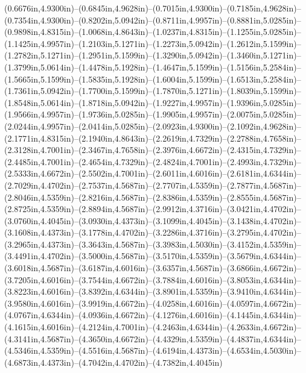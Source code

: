 (0.6676in,4.9300in)--(0.6845in,4.9628in)--(0.7015in,4.9300in)--(0.7185in,4.9628in)--(0.7354in,4.9300in)--(0.8202in,5.0942in)--(0.8711in,4.9957in)--(0.8881in,5.0285in)--(0.9898in,4.8315in)--(1.0068in,4.8643in)--(1.0237in,4.8315in)--(1.1255in,5.0285in)--(1.1425in,4.9957in)--(1.2103in,5.1271in)--(1.2273in,5.0942in)--(1.2612in,5.1599in)--(1.2782in,5.1271in)--(1.2951in,5.1599in)--(1.3290in,5.0942in)--(1.3460in,5.1271in)--(1.3799in,5.0614in)--(1.4478in,5.1928in)--(1.4647in,5.1599in)--(1.5156in,5.2584in)--(1.5665in,5.1599in)--(1.5835in,5.1928in)--(1.6004in,5.1599in)--(1.6513in,5.2584in)--(1.7361in,5.0942in)--(1.7700in,5.1599in)--(1.7870in,5.1271in)--(1.8039in,5.1599in)--(1.8548in,5.0614in)--(1.8718in,5.0942in)--(1.9227in,4.9957in)--(1.9396in,5.0285in)--(1.9566in,4.9957in)--(1.9736in,5.0285in)--(1.9905in,4.9957in)--(2.0075in,5.0285in)--(2.0244in,4.9957in)--(2.0414in,5.0285in)--(2.0923in,4.9300in)--(2.1092in,4.9628in)--(2.1771in,4.8315in)--(2.1940in,4.8643in)--(2.2619in,4.7329in)--(2.2788in,4.7658in)--(2.3128in,4.7001in)--(2.3467in,4.7658in)--(2.3976in,4.6672in)--(2.4315in,4.7329in)--(2.4485in,4.7001in)--(2.4654in,4.7329in)--(2.4824in,4.7001in)--(2.4993in,4.7329in)--(2.5333in,4.6672in)--(2.5502in,4.7001in)--(2.6011in,4.6016in)--(2.6181in,4.6344in)--(2.7029in,4.4702in)--(2.7537in,4.5687in)--(2.7707in,4.5359in)--(2.7877in,4.5687in)--(2.8046in,4.5359in)--(2.8216in,4.5687in)--(2.8386in,4.5359in)--(2.8555in,4.5687in)--(2.8725in,4.5359in)--(2.8894in,4.5687in)--(2.9912in,4.3716in)--(3.0421in,4.4702in)--(3.0760in,4.4045in)--(3.0930in,4.4373in)--(3.1099in,4.4045in)--(3.1438in,4.4702in)--(3.1608in,4.4373in)--(3.1778in,4.4702in)--(3.2286in,4.3716in)--(3.2795in,4.4702in)--(3.2965in,4.4373in)--(3.3643in,4.5687in)--(3.3983in,4.5030in)--(3.4152in,4.5359in)--(3.4491in,4.4702in)--(3.5000in,4.5687in)--(3.5170in,4.5359in)--(3.5679in,4.6344in)--(3.6018in,4.5687in)--(3.6187in,4.6016in)--(3.6357in,4.5687in)--(3.6866in,4.6672in)--(3.7205in,4.6016in)--(3.7544in,4.6672in)--(3.7884in,4.6016in)--(3.8053in,4.6344in)--(3.8223in,4.6016in)--(3.8392in,4.6344in)--(3.8901in,4.5359in)--(3.9410in,4.6344in)--(3.9580in,4.6016in)--(3.9919in,4.6672in)--(4.0258in,4.6016in)--(4.0597in,4.6672in)--(4.0767in,4.6344in)--(4.0936in,4.6672in)--(4.1276in,4.6016in)--(4.1445in,4.6344in)--(4.1615in,4.6016in)--(4.2124in,4.7001in)--(4.2463in,4.6344in)--(4.2633in,4.6672in)--(4.3141in,4.5687in)--(4.3650in,4.6672in)--(4.4329in,4.5359in)--(4.4837in,4.6344in)--(4.5346in,4.5359in)--(4.5516in,4.5687in)--(4.6194in,4.4373in)--(4.6534in,4.5030in)--(4.6873in,4.4373in)--(4.7042in,4.4702in)--(4.7382in,4.4045in)
